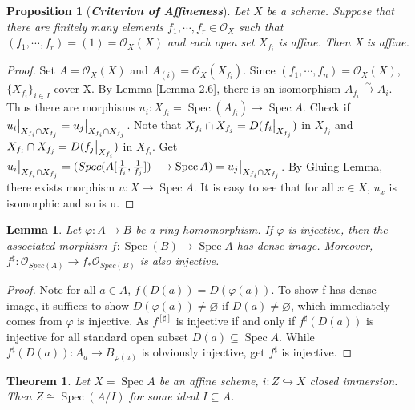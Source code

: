 \documentclass{ctexart}
\newtheorem{theorem}{Theorem}[section]
\newtheorem{proposition}{Proposition}[section]
\newtheorem{lemma}{Lemma}[section]
\newcommand{\spec}{\operatorname{Spec}}
\begin{document}
\begin{proposition}[\textbf{\emph{Criterion of Affineness}}]
    Let $X$ be a scheme.
    Suppose that there are finitely many elements $f_{1}, \cdots, f_{r}\in \mathcal{O}_{X}$ such that $(f_{1}, \cdots, f_{r}) = (1) = \mathcal{O}_{X}(X)$ and each open set $X_{f_{i}}$ is affine.
    Then X is affine.
    \label{Proposition 2.1} 
\end{proposition}
\begin{proof}
    Set $A = \mathcal{O}_{X}(X)$ and $A_(i) = \mathcal{O}_{X}(X_{f_{i}})$.
    Since $(f_{1}, \cdots, f_{n}) = \mathcal{O}_{X}(X)$, $\{X_{f_{i}}\}_{i\in I}$ cover X.
    By Lemma \ref{Lemma 2.6}, there is an isomorphism $A_{f_{i}} \overset{\sim}{\longrightarrow} A_{i}$.
    Thus there are morphisms $u_{i}: X_{f_{i}} = \spec(A_{f_{i}}) \longrightarrow \spec A$.
    Check if $u_{i}\big{|}_{X_{f_{i}} \cap X_{f_{j}}} = u_{j}\big{|}_{X_{f_{i}} \cap X_{f_{j}}}$.
    Note that $X_{f_{i}} \cap X_{f_{j}} = D(f_{i}\big{|}_{X_{f_{j}}})$ in $X_{f_{j}}$ and $X_{f_{i}} \cap X_{f_{j}} = D(f_{j}\big{|}_{X_{f_{i}}})$ in $X_{f_{i}}$.
    Get $u_{i}\big{|}_{X_{f_{i}} \cap X_{f_{j}}} = (Spec(A[\frac{1}{f_{i}}, \frac{1}{f_{j}}]) \longrightarrow \spec A) = u_{j}\big{|}_{X_{f_{i}} \cap X_{f_{j}}}$.
    By Gluing Lemma, there exists morphism $u: X \longrightarrow \spec A$.
    It is easy to see that for all $x\in X$, $u_{x}$ is isomorphic and so is u. 
\end{proof}
\begin{lemma}
    Let $\varphi: A \longrightarrow B$ be a ring homomorphism.
    If $\varphi$ is injective, then the associated morphism $f: \spec(B) \longrightarrow \spec A$ has dense image.
    Moreover, $f^{\sharp}: \mathcal{O}_{Spec(A)} \longrightarrow f_{\ast}\mathcal{O}_{Spec(B)}$ is also injective.
    \label{Lemma 2.7}
\end{lemma}
\begin{proof}
    Note for all $a\in A$, $f(D(a)) = D(\varphi(a))$.
    To show f has dense image, it suffices to show $D(\varphi(a)) \neq \varnothing$ if $D(a) \neq \varnothing$, which immediately comes from $\varphi$ is injective.
    As $f^[\sharp]$ is injective if and only if $f^{\sharp}(D(a))$ is injective for all standard open subset $D(a) \subseteq \spec A$.
    While $f^{\sharp}(D(a)): A_{a} \longrightarrow B_{\varphi(a)}$ is obviously injective, get $f^{\sharp}$ is injective.  
\end{proof}
\begin{theorem}                                                                                                                                                                                                                                                                             
    Let $X = \spec A$ be an affine scheme, $i: Z \hookrightarrow X$ closed immersion.
    Then $Z \cong \spec(A/I)$ for some ideal $I \subseteq A$.
    \label{Theorem 2.1}
\end{theorem}
\end{document}

